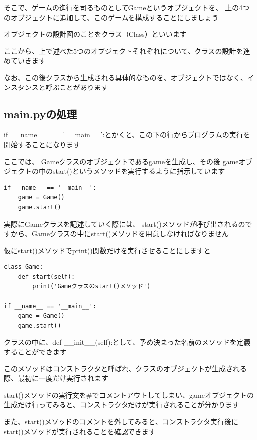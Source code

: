 \documentclass[uplatex,a4paper,11pt,oneside,openany]{jsbook}
\begin{document}
そこで、ゲームの進行を司るものとしてGameというオブジェクトを、
上の4つのオブジェクトに追加して、このゲームを構成することにしましょう

オブジェクトの設計図のことをクラス（Class）といいます

ここから、上で述べた5つのオブジェクトそれぞれについて、クラスの設計を進めていきます

なお、この後クラスから生成される具体的なものを、オブジェクトではなく、インスタンスと呼ぶことがあります

\subsection{main.pyの処理}

if \_\_name\_\_ == '\_\_main\_\_':とかくと、この下の行からプログラムの実行を開始することになります

ここでは、
Gameクラスのオブジェクトであるgameを生成し、その後
gameオブジェクトの中のstart()というメソッドを実行するように指示しています

\begin{lstlisting}[caption=main.py,label=prog01-1]
if __name__ == '__main__':
    game = Game()
    game.start()
\end{lstlisting}%

実際にGameクラスを記述していく際には、
start()メソッドが呼び出されるのですから、Gameクラスの中にstart()メソッドを用意しなければなりません

仮にstart()メソッドでprint()関数だけを実行させることにしますと

\begin{lstlisting}[caption=main.pyとGame.py,label=prog01-2]
class Game:
    def start(self):
        print('Gameクラスのstart()メソッド')

if __name__ == '__main__':
    game = Game()
    game.start()
\end{lstlisting}%

クラスの中に、def \_\_init\_\_(self):として、予め決まった名前のメソッドを定義することができます

このメソッドはコンストラクタと呼ばれ、クラスのオブジェクトが生成される際、最初に一度だけ実行されます

start()メソッドの実行文を\#でコメントアウトしてしまい、gameオブジェクトの生成だけ行ってみると、コンストラクタだけが実行されることが分かります

また、start()メソッドのコメントを外してみると、コンストラクタ実行後にstart()メソッドが実行されることを確認できます
\end{document}

